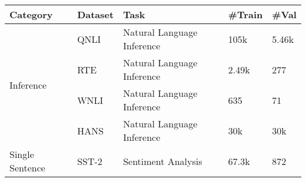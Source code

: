 
\begin{table*}[ht]
\centering
\begin{tabular}{lllll}
  \toprule
  \textbf{Category} & \textbf{Dataset} & \textbf{Task} & \textbf{\#Train} & \textbf{\#Val} \\
  \midrule
  \multirow{4}{*}{Inference} & QNLI \citep{wang-etal-2018-glue} & Natural Language Inference & 105k & 5.46k \\
  & RTE \tablefootnote{\citep{dagan2006pascal, bar2006second, giampiccolo2007third, bentivogli2009fifth}} & Natural Language Inference & 2.49k & 277 \\
  & WNLI \citep{levesque2011winograd} & Natural Language Inference & 635 & 71 \\
  & HANS \citep{DBLP:journals/corr/abs-1902-01007} & Natural Language Inference & 30k & 30k \\
  \midrule
  Single Sentence & SST-2 \citep{socher2013recursive} & Sentiment Analysis & 67.3k & 872 \\

\end{tabular}
\end{table*}
